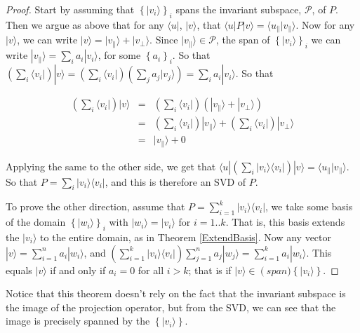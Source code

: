 \documentclass{amsbook}
\begin{document}
\begin{proof}
Start by assuming that $\left\{|v_i\rangle\right\}_i$ spans the invariant subspace, $\mathcal P$, of $P$.  Then we argue as above that for any $\langle u|$, $|v\rangle$, that $\langle u|P|v\rangle=\langle u_\parallel|v_\parallel\rangle$.  Now for any $|v\rangle$, we can write $|v\rangle=|v_\parallel\rangle+|v_\bot\rangle$.  Since $|v_\parallel\rangle\in\mathcal P$, the span of $\left\{|v_i\rangle\right\}_i$ we can write $|v_\parallel\rangle=\sum_ia_i|v_i\rangle$, for some $\left\{a_i\right\}_i$.  So that $\left(\sum_i\langle v_i|\right)|v\rangle=\left(\sum_i\langle v_i|\right)\left(\sum_ja_j|v_j\rangle\right)=\sum_ia_i|v_i\rangle$.  So that 

$$
\begin{array}{rcl}
\left(\sum_i\langle v_i|\right)|v\rangle &=& \left(\sum_i\langle v_i|\right)\left(|v_\parallel\rangle+|v_\bot\rangle\right) \\
&=& \left(\sum_i\langle v_i|\right)|v_\parallel\rangle + \left(\sum_i\langle v_i|\right)|v_\bot\rangle \\
&=& |v_\parallel\rangle + 0
\end{array}
$$

Applying the same to the other side, we get that $\langle u|\left(\sum_i|v_i\rangle\langle v_i|\right)| v\rangle=\langle u_\parallel|v_\parallel\rangle$.  So that $P=\sum_i|v_i\rangle\langle v_i|$, and this is therefore an SVD of $P$.

To prove the other direction, assume that $P=\sum_{i=1}^k|v_i\rangle\langle v_i|$, we take some basis of the domain $\left\{|w_i\rangle\right\}_i$ with $|w_i\rangle=|v_i\rangle$ for $i=1..k$.  That is, this basis extends the $|v_i\rangle$ to the entire domain, as in Theorem \ref{ExtendBasis}.  Now any vector $|v\rangle=\sum_{i=1}^na_i|w_i\rangle$, and $\left(\sum_{i=1}^k|v_i\rangle\langle v_i|\right)\sum_{j=1}^na_j|w_j\rangle=\sum_{i=1}^ka_i|w_i\rangle$.  This equals $|v\rangle$ if and only if $a_i=0$ for all $i>k$; that is if $|v\rangle\in\operatorname(span)\left\{|v_i\rangle\right\}$.
\end{proof}

Notice that this theorem doesn't rely on the fact that the invariant subspace is the image of the projection operator, but from the SVD, we can see that the image is precisely spanned by the $\left\{|v_i\rangle\right\}$.
\end{document}
